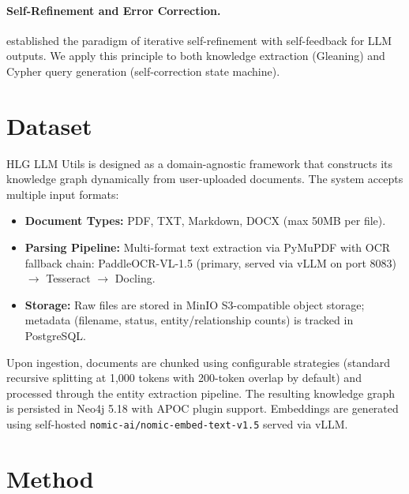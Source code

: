 \documentclass[11pt]{article}
\begin{document}
\paragraph{Self-Refinement and Error Correction.}
\citet{madaan2023selfrefine} established the paradigm of iterative self-refinement with self-feedback for LLM outputs. We apply this principle to both knowledge extraction (Gleaning) and Cypher query generation (self-correction state machine).

\section{Dataset}

HLG LLM Utils is designed as a domain-agnostic framework that constructs its knowledge graph dynamically from user-uploaded documents. The system accepts multiple input formats:

\begin{itemize}[leftmargin=*]
    \item \textbf{Document Types:} PDF, TXT, Markdown, DOCX (max 50MB per file).
    \item \textbf{Parsing Pipeline:} Multi-format text extraction via PyMuPDF with OCR fallback chain: PaddleOCR-VL-1.5 (primary, served via vLLM on port 8083) $\to$ Tesseract $\to$ Docling.
    \item \textbf{Storage:} Raw files are stored in MinIO S3-compatible object storage; metadata (filename, status, entity/relationship counts) is tracked in PostgreSQL.
\end{itemize}

Upon ingestion, documents are chunked using configurable strategies (standard recursive splitting at 1,000 tokens with 200-token overlap by default) and processed through the entity extraction pipeline. The resulting knowledge graph is persisted in Neo4j 5.18 with APOC plugin support. Embeddings are generated using self-hosted \texttt{nomic-ai/nomic-embed-text-v1.5} served via vLLM.

\section{Method}
\end{document}
